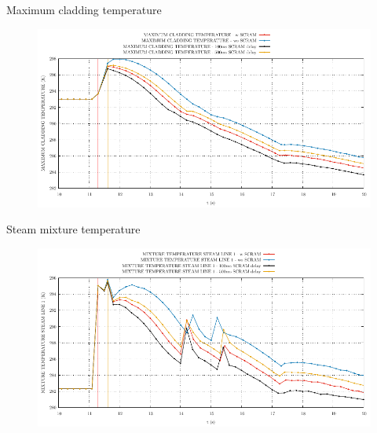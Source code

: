 \begin{frame}{Maximum cladding temperature}
	\begin{figure}
			\centering
			\includegraphics[width=\textwidth]{./01PressureAccident/graphs/MAXIMUM CLADDING TEMPERATURE_comp.pdf}
			
		\end{figure}
	
\end{frame}






















\begin{frame}{Steam mixture temperature}
	\begin{figure}
		\centering
		\includegraphics[width=\textwidth]{./01PressureAccident/graphs/MIXTURE TEMPERATURE STEAM LINE 1_comp.pdf}
		
	\end{figure}
	
\end{frame}


